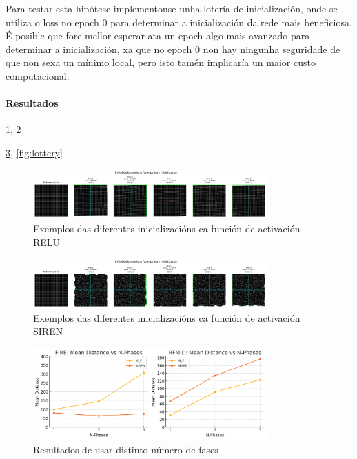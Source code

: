 Para testar esta hipótese implementouse unha lotería de inicialización, onde se utiliza o loss no epoch 0 para determinar a inicialización da rede mais beneficiosa.
É posible que fore mellor esperar ata un epoch algo mais avanzado para determinar a inicialización, xa que no epoch 0 non hay ningunha seguridade de que non sexa un mínimo local, pero isto tamén implicaría un maior custo computacional.

\paragraph{Resultados}
\label{par:Resultados-initialization}

\ref{fig:lottery_initial_deformations_combinedMLP}, \ref{fig:lottery_initial_deformations_combinedSIREN}

\ref{fig:nphases}, \ref{fig:lottery}

\begin{figure}[ht]
    \centering
    \includegraphics[width=0.8\textwidth]{imaxes/lottery/initial_deformations_combinedMLP.png}
    \caption{Exemplos das diferentes inicializacións ca función de activación RELU}
    \label{fig:lottery_initial_deformations_combinedMLP}
\end{figure}

\begin{figure}[ht]
    \centering
    \includegraphics[width=0.8\textwidth]{imaxes/lottery/initial_deformations_combinedSIREN.png}
    \caption{Exemplos das diferentes inicializacións ca función de activación SIREN}
    \label{fig:lottery_initial_deformations_combinedSIREN}
\end{figure}

\begin{figure}[ht]
    \centering
    \includegraphics[width=0.8\textwidth]{imaxes/lottery/nphases.png}
    \caption{Resultados de usar distinto número de fases}
    \label{fig:nphases}
\end{figure}

